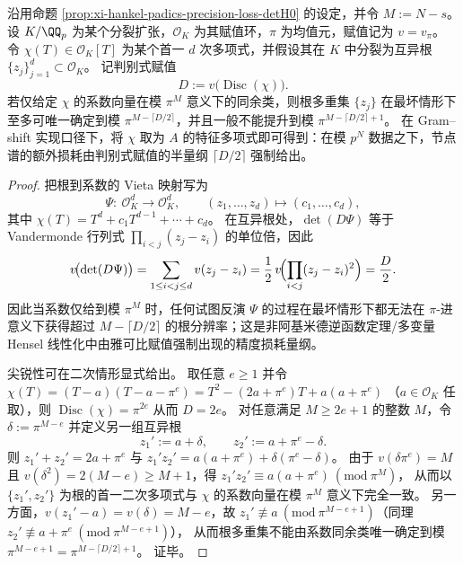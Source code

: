 \begin{theorem}\label{thm:xi-padic-root-resolution-discriminant-half-loss}
沿用命题 \ref{prop:xi-hankel-padics-precision-loss-detH0} 的设定，并令 \(M:=N-s\)。
设 \(K/\QQ_p\) 为某个分裂扩张，\(\mathcal O_K\) 为其赋值环，\(\pi\) 为均值元，赋值记为 \(v=v_\pi\)。
令 \(\chi(T)\in\mathcal O_K[T]\) 为某个首一 \(d\) 次多项式，并假设其在 \(K\) 中分裂为互异根 \(\{z_j\}_{j=1}^{d}\subset\mathcal O_K\)。
记判别式赋值
\[
D:=v\!\bigl(\operatorname{Disc}(\chi)\bigr).
\]
若仅给定 \(\chi\) 的系数向量在模 \(\pi^{M}\) 意义下的同余类，则根多重集 \(\{z_j\}\) 在最坏情形下至多可唯一确定到模 \(\pi^{M-\lceil D/2\rceil}\)，并且一般不能提升到模 \(\pi^{M-\lceil D/2\rceil+1}\)。
在 Gram--shift 实现口径下，将 \(\chi\) 取为 \(A\) 的特征多项式即可得到：在模 \(p^{N}\) 数据之下，节点谱的额外损耗由判别式赋值的半量纲 \(\lceil D/2\rceil\) 强制给出。
\end{theorem}

\begin{proof}
把根到系数的 Vieta 映射写为
\[
\Psi:\ \mathcal O_K^{d}\longrightarrow \mathcal O_K^{d},\qquad
(z_1,\dots,z_d)\longmapsto (c_1,\dots,c_d),
\]
其中 \(\chi(T)=T^{d}+c_1T^{d-1}+\cdots+c_d\)。
在互异根处，\(\det(D\Psi)\) 等于 Vandermonde 行列式 \(\prod_{i<j}(z_j-z_i)\) 的单位倍，因此
\[
v\!\bigl(\det(D\Psi)\bigr)=\sum_{1\le i<j\le d}v(z_j-z_i)=\frac12\,v\!\Bigl(\prod_{i<j}(z_j-z_i)^2\Bigr)=\frac{D}{2}.
\]
因此当系数仅给到模 \(\pi^{M}\) 时，任何试图反演 \(\Psi\) 的过程在最坏情形下都无法在 \(\pi\)-进意义下获得超过 \(M-\lceil D/2\rceil\) 的根分辨率；这是非阿基米德逆函数定理/多变量 Hensel 线性化中由雅可比赋值强制出现的精度损耗量纲。
\par
尖锐性可在二次情形显式给出。
取任意 \(e\ge 1\) 并令
\(
\chi(T)=(T-a)(T-a-\pi^{e})
=T^2-(2a+\pi^{e})T+a(a+\pi^{e})
\)
（\(a\in\mathcal O_K\) 任取），则 \(\operatorname{Disc}(\chi)=\pi^{2e}\) 从而 \(D=2e\)。
对任意满足 \(M\ge 2e+1\) 的整数 \(M\)，令 \(\delta:=\pi^{M-e}\) 并定义另一组互异根
\[
z_1':=a+\delta,\qquad z_2':=a+\pi^{e}-\delta.
\]
则 \(z_1'+z_2'=2a+\pi^e\) 与 \(z_1'z_2'=a(a+\pi^e)+\delta(\pi^e-\delta)\)。
由于 \(v(\delta\pi^e)=M\) 且 \(v(\delta^2)=2(M-e)\ge M+1\)，得
\(
z_1'z_2'\equiv a(a+\pi^e)\ (\mathrm{mod}\ \pi^{M})
\)，
从而以 \(\{z_1',z_2'\}\) 为根的首一二次多项式与 \(\chi\) 的系数向量在模 \(\pi^{M}\) 意义下完全一致。
另一方面，\(v(z_1'-a)=v(\delta)=M-e\)，故 \(z_1'\not\equiv a\ (\mathrm{mod}\ \pi^{M-e+1})\)（同理 \(z_2'\not\equiv a+\pi^e\ (\mathrm{mod}\ \pi^{M-e+1})\)），
从而根多重集不能由系数同余类唯一确定到模 \(\pi^{M-e+1}=\pi^{M-\lceil D/2\rceil+1}\)。
证毕。
\end{proof}

